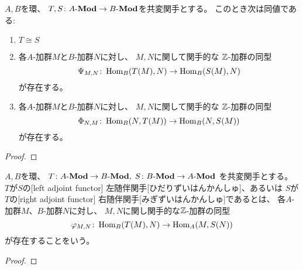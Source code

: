 \documentclass[report]{jlreq}
\begin{document}
\begin{theorem}
    $A, B$を環、
    $T, S \colon A\text{-}\mathbf{Mod} \to B\text{-}\mathbf{Mod}$を共変関手とする。
    このとき次は同値である:
    \begin{enumerate}
        \item $T \cong S$
        \item 各$A$-加群$M$と$B$-加群$N$に対し、
            $M, N$に関して関手的な
            $\mathbb{Z}$-加群の同型
            \begin{equation}
                \Psi_{M, N} \colon
                    \operatorname{Hom}_B(T(M), N)
                    \to
                    \operatorname{Hom}_B(S(M), N)
            \end{equation}
            が存在する。
        \item 各$A$-加群$M$と$B$-加群$N$に対し、
            $M, N$に関して関手的な
            $\mathbb{Z}$-加群の同型
            \begin{equation}
                \Phi_{N, M} \colon
                    \operatorname{Hom}_B(N, T(M))
                    \to
                    \operatorname{Hom}_B(N, S(M))
            \end{equation}
            が存在する。
    \end{enumerate}
\end{theorem}

\begin{proof}
    \TODO{}
\end{proof}

\begin{definition}[随伴関手]
    $A, B$を環、
    $T \colon A\text{-}\mathbf{Mod} \to B\text{-}\mathbf{Mod}, \;
    S \colon B\text{-}\mathbf{Mod} \to A\text{-}\mathbf{Mod}$
    を共変関手とする。
    $T$が$S$の[left adjoint functor]
    {左随伴関手}[ひだりずいはんかんしゅ]、あるいは
    $S$が$T$の[right adjoint functor]
    {右随伴関手}[みぎずいはんかんしゅ]であるとは、
    各$A$-加群$M$、$B$-加群$N$に対し、
    $M, N$に関し関手的な$\mathbb{Z}$-加群の同型
    \begin{equation}
        \varphi_{M, N} \colon
            \operatorname{Hom}_B(T(M), N)
            \to
            \operatorname{Hom}_A(M, S(N))
    \end{equation}
    が存在することをいう。
\end{definition}

\begin{theorem}[随伴の一意性]
    \TODO{}
\end{theorem}

\begin{proof}
    \TODO{}
\end{proof}
\end{document}
